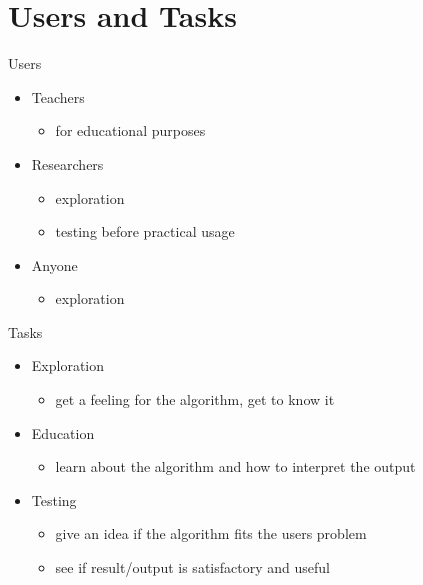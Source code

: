 \documentclass[naustrian]{beamer}
\begin{document}
\section{Users and Tasks}

\begin{frame}{Users}
\begin{itemize}
 \item Teachers
            \begin{itemize}
                \item for educational purposes
            \end{itemize}
  \item Researchers
            \begin{itemize}
                \item exploration
                \item testing before practical usage
            \end{itemize}
\item Anyone
            \begin{itemize}
                \item exploration
            \end{itemize}
  \end{itemize}
\end{frame}

\begin{frame}{Tasks}
\begin{itemize}
 \item Exploration
            \begin{itemize}
                \item get a feeling for the algorithm, get to know it
            \end{itemize}
 \item Education
  	\begin{itemize}
                \item learn about the algorithm and how to interpret the output
            \end{itemize}
  \item Testing
            \begin{itemize}
                \item give an idea if the algorithm fits the users problem
                \item see if result/output is satisfactory and useful
            \end{itemize}
  \end{itemize}
\end{frame}
\end{document}
